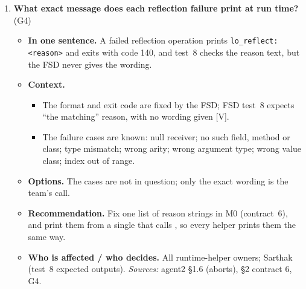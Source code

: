 \documentclass[10pt]{article}
\newcommand{\code}[1]{\texttt{\small #1}}
\newcommand{\mV}{\textsf{\scriptsize[V]}}
\newcommand{\field}[1]{\textbf{#1}\enspace}
\newcommand{\decitem}[1]{\needspace{6\baselineskip}\setcounter{enumi}{\numexpr#1-1\relax}\item}
\begin{document}
\begin{enumerate}[label=\textbf{\arabic*.},ref=\arabic*,leftmargin=1.8em,itemsep=0.8em]
\begin{itemize}
\begin{itemize}
\end{itemize}
\item[] \field{Options.} Accept each proposal above, or replace it; the \code{invoke} return-type encoding still needs a pick.
\item[] \field{Recommendation.} Adopt agent2's layout (\S\ref{sec:lo5-metadata}) as M0 contract~1, accept the proposals above, and lock the layout with paired compiler and Rust layout tests. The G3 proposal departs mechanically from §6's wording, so record it in the FSD (Table~\ref{tab:fsdfixes}).
\item[] \field{Who is affected / who decides.} Jay, Rahik and Sarthak co-sign the layouts; Neha's query helpers read them. LO-5 only. \emph{Sources:} agent2 facts 0.5--0.6, §1.6, §2 contracts 1, 2, 5, §5, G2, G3, G9.
\end{itemize}

\decitem{9}\label{dec:abort}\textbf{What exact message does each reflection failure print at run time?} (G4)
\begin{itemize}
\item[] \field{In one sentence.} A failed reflection operation prints \code{lo\_reflect: <reason>} and exits with code 140, and test~8 checks the reason text, but the FSD never gives the wording.
\item[] \field{Context.}
\begin{itemize}
\item The format and exit code are fixed by the FSD; FSD test~8 expects ``the matching'' reason, with no wording given \mV.
\item The failure cases are known: null receiver; no such field, method or class; type mismatch; wrong arity; wrong argument type; wrong value class; index out of range.
\end{itemize}
\item[] \field{Options.} The cases are not in question; only the exact wording is the team's call.
\item[] \field{Recommendation.} Fix one list of reason strings in M0 (contract~6), and print them from a single  that calls , so every helper prints them the same way.
\item[] \field{Who is affected / who decides.} All runtime-helper owners; Sarthak (test~8 expected outputs). \emph{Sources:} agent2 §1.6 (aborts), §2 contract 6, G4.
\end{itemize}


\end{enumerate}
\end{document}
